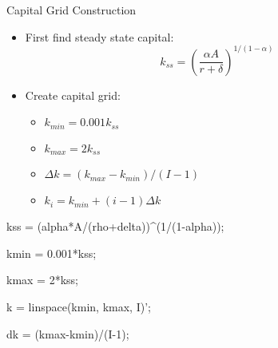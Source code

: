 \documentclass[]{beamer}
\newenvironment{code}{\begin{semiverbatim}\footnotesize}{\end{semiverbatim}}
\begin{document}
\begin{frame}{Capital Grid Construction}
    \begin{itemize}
        \item First find steady state capital:
        \[k_{ss} = \left(\frac{\alpha A}{r+\delta}\right)^{1/(1-\alpha)}\]
        \item Create capital grid:
        \begin{itemize}
            \item $k_{min} = 0.001k_{ss}$
            \item $k_{max} = 2k_{ss}$
            \item $\Delta k = (k_{max}-k_{min})/(I-1)$
            \item $k_i = k_{min} + (i-1)\Delta k$
        \end{itemize}
    \end{itemize}
    \begin{code}
    kss = (alpha*A/(rho+delta))^(1/(1-alpha));
    

    kmin = 0.001*kss;
    
    kmax = 2*kss;
    
    k = linspace(kmin, kmax, I)';
    
    dk = (kmax-kmin)/(I-1);
    \end{code}
\end{frame}
\end{document}
